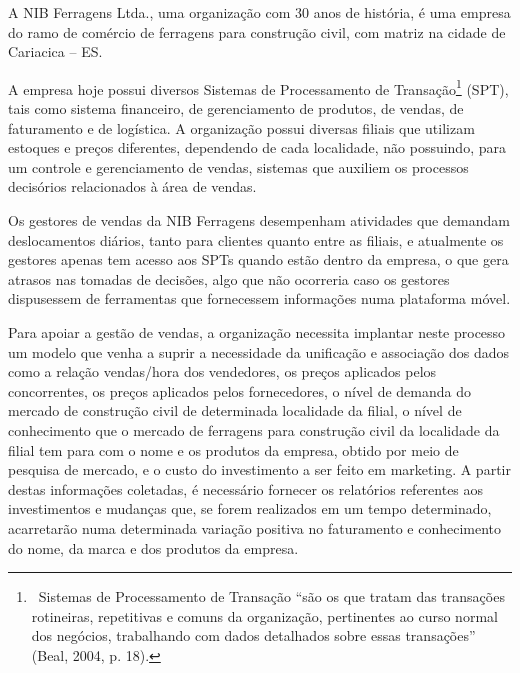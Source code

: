 \documentclass[a4paper]{article}
\begin{document}
\bigskip

{\sffamily
A NIB Ferragens Ltda., uma organiza\c{c}\~ao com 30 anos de hist\'oria, \'e uma empresa do ramo de com\'ercio de
ferragens para constru\c{c}\~ao civil, com matriz na cidade de Cariacica -- ES.}

{
\textsf{A empresa hoje possui diversos Sistemas de Processamento de Transa\c{c}\~ao}\footnote{\ \textsf{Sistemas de
Processamento de Transa\c{c}\~ao ``s\~ao os que tratam das transa\c{c}\~oes rotineiras, repetitivas e comuns da
organiza\c{c}\~ao, pertinentes ao curso normal dos neg\'ocios, trabalhando com dados detalhados sobre essas
transa\c{c}\~oes'' (Beal, 2004, p. 18).}\par \par }\textsf{ (SPT), tais como sistema financeiro, de gerenciamento de
produtos, de vendas, de faturamento e de log\'istica. A organiza\c{c}\~ao possui diversas filiais que utilizam estoques
e pre\c{c}os diferentes, dependendo de cada localidade, n\~ao possuindo, para um controle e gerenciamento de vendas,
sistemas que auxiliem os processos decis\'orios relacionados \`a \'area de vendas.}}

{
\textsf{Os gestores de vendas da NIB Ferragens desempenham atividades que demandam deslocamentos di\'arios, tanto para
clientes quanto entre as filiais, e atualmente os gestores apenas tem acesso aos SPTs quando est\~ao dentro da empresa,
o que gera atrasos nas tomadas de decis\~oes, algo que n\~ao ocorreria caso os gestores dispusessem de ferramentas que
fornecessem informa\c{c}\~oes numa plataforma m\'ovel.}}

{
\textsf{Para apoiar a gest\~ao de vendas, a organiza\c{c}\~ao necessita implantar neste processo um modelo que venha a
suprir a necessidade da unifica\c{c}\~ao e associa\c{c}\~ao dos dados como a rela\c{c}\~ao vendas/hora dos vendedores,
os pre\c{c}os aplicados pelos concorrentes, os pre\c{c}os aplicados pelos fornecedores, o n\'ivel de demanda do mercado
de constru\c{c}\~ao civil de determinada localidade da filial, o n\'ivel de conhecimento que o mercado de ferragens
para constru\c{c}\~ao civil da localidade da filial tem para com o nome e os produtos da empresa, obtido por meio de
pesquisa de mercado, e o custo do investimento a ser feito em marketing. A partir destas informa\c{c}\~oes coletadas,
\'e necess\'ario fornecer os relat\'orios referentes aos investimentos e mudan\c{c}as que, se forem realizados em um
tempo determinado, }\textsf{acarretar\~ao numa determinada varia\c{c}\~ao positiva no faturamento e conhecimento do
nome, da marca e dos produtos da empresa.}}
\end{document}
